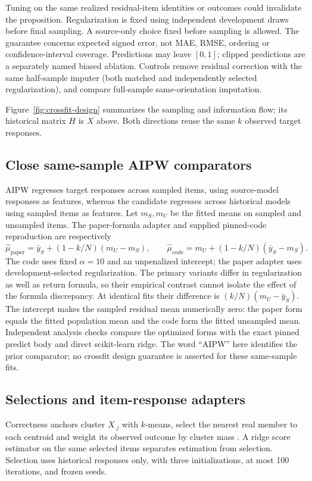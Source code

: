\documentclass{article}
\begin{document}
Tuning on the same realized residual-item identities or outcomes could invalidate the proposition. Regularization is fixed using independent development draws before final sampling. A source-only choice fixed before sampling is allowed. The guarantee concerns expected signed error, not MAE, RMSE, ordering or confidence-interval coverage. Predictions may leave $[0,1]$; clipped predictions are a separately named biased ablation. Controls remove residual correction with the same half-sample imputer (both matched and independently selected regularization), and compare full-sample same-orientation imputation.

Figure~\ref{fig:crossfit-design} summarizes the sampling and information flow; its historical matrix $H$ is $X$ above. Both directions reuse the same $k$ observed target responses.


\subsection{Close same-sample AIPW comparators}
AIPW regresses target responses across sampled items, using source-model responses as features, whereas the candidate regresses across historical models using sampled items as features. Let $m_S,m_U$ be the fitted means on sampled and unsampled items. The paper-formula adapter \citep[Eq.~3]{zhang2025misses} and supplied pinned-code reproduction are respectively
\begin{equation}\label{eq:aipw}
 \widehat\mu_{\mathrm{paper}}=\bar y_S+(1-k/N)(m_U-m_S),\qquad
 \widehat\mu_{\mathrm{code}}=m_U+(1-k/N)(\bar y_S-m_S).
\end{equation}
The code uses fixed $\alpha=10$ and an unpenalized intercept; the paper adapter uses development-selected regularization. The primary variants differ in regularization as well as return formula, so their empirical contrast cannot isolate the effect of the formula discrepancy. At identical fits their difference is $(k/N)(m_U-\bar y_S)$. The intercept makes the sampled residual mean numerically zero: the paper form equals the fitted population mean and the code form the fitted unsampled mean. Independent analysis checks compare the optimized forms with the exact pinned predict body and direct scikit-learn ridge. The word ``AIPW'' here identifies the prior comparator; no crossfit design guarantee is asserted for these same-sample fits.

\subsection{Selections and item-response adapters}
Correctness anchors cluster $X_{\cdot j}$ with $k$-means, select the nearest real member to each centroid and weight its observed outcome by cluster mass \citep{maiapolo2024tiny}. A ridge score estimator on the same selected items separates estimation from selection. Selection uses historical responses only, with three initializations, at most 100 iterations, and frozen seeds.
\end{document}
